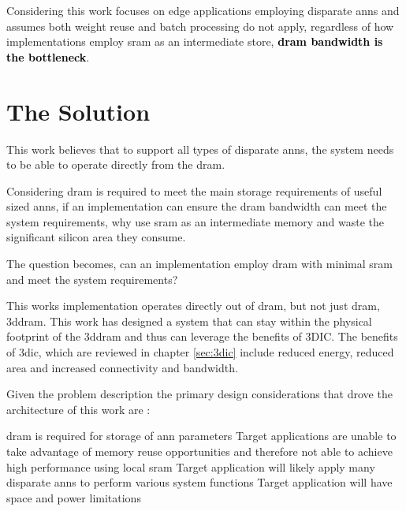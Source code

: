 Considering this work focuses on edge applications employing disparate \ac{ann}s and assumes both weight reuse and batch processing do not apply, regardless of how implementations employ \ac{sram} as an intermediate store, \textbf{\textcolor{black}{\ac{dram} bandwidth is the bottleneck}}.



\iffalse How this work addresses the problem are outlined in section \ref{chap-five}. \fi


\section[The Solution]{The Solution}
\label{sec:The Solution}

This work believes that to support all types of disparate \ac{ann}s, the system needs to be able to operate directly from the \ac{dram}.
\iffalse 
This is because SRAM-based solutions assume memory reuse when processing a \ac{ann}.
However, when \ac{ann}s do not provide sufficient reuse these solutions become \ac{dram} bandwidth bound. 
\fi

Considering \ac{dram} is required to meet the main storage requirements of useful sized \ac{ann}s, if an implementation can ensure the \ac{dram} bandwidth can meet the system requirements, why use \ac{sram} as an intermediate memory and waste the significant silicon area they consume.

The question becomes, can an implementation employ \ac{dram} with minimal \ac{sram} and meet the system requirements?

This works implementation operates directly out of \ac{dram}, but not just \ac{dram}, \ac{3ddram}.
This work has designed a system that can stay within the physical footprint of the \ac{3ddram} and thus can leverage the benefits of 3DIC.
The benefits of \ac{3dic}, which are reviewed in chapter \ref{sec:3dic} include reduced energy, reduced area and increased connectivity and bandwidth.

\iffalse
Therefore, this work is able to propose a custom 3D-\ac{dram} that exposes more of the \ac{dram}s internal page and thus generates interface bandwidth that is of the order of 64 times that of the standard \ac{3ddram}.
\fi

Given the problem description \iffalse outlined in section \ref{sec:The Problem},\fi the primary design considerations that drove the architecture of this work are :
\begin{outline}
  \1 \ac{dram} is required for storage of \ac{ann} parameters 
  \1 Target applications are unable to take advantage of memory reuse opportunities and therefore not able to achieve high performance using local \ac{sram} \iffalse to store \ac{ann} parameters or the \ac{ann} input \fi
  \1 Target application will likely apply many disparate \acp{ann} to perform various system functions
  \1 Target application will have space and power limitations
\end{outline}

